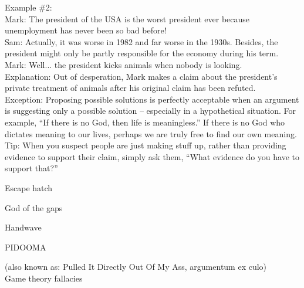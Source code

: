 \documentclass[a4paper,12pt,single,pdftex]{scrartcl}
\begin{document}
{    
      Example \#2:
    \\

    
      Mark: The president of the USA is the worst president ever because unemployment has never been so bad before!
    \\

    
      Sam: Actually, it was worse in 1982 and far worse in the 1930s.  Besides, the president might only be partly responsible for the economy during his term.
    \\

    
      Mark: Well... the president kicks animals when nobody is looking.
    \\

    
      Explanation: Out of desperation, Mark makes a claim about the president's private treatment of animals after his original claim has been refuted.
    \\

    
      Exception: Proposing possible solutions is perfectly acceptable when an argument is suggesting only a possible solution -- especially in a hypothetical situation. For example, “If there is no God, then life is meaningless.”  If there is no God who dictates meaning to our lives, perhaps we are truly free to find our own meaning.
    \\

    
      Tip: When you suspect people are just making stuff up, rather than providing evidence to support their claim, simply ask them, “What evidence do you have to support that?”
    \\

  }


Escape hatch

God of the gaps

Handwave

PIDOOMA
    
      (also known as:  Pulled It Directly Out Of My Ass, argumentum ex culo)
    \\

  

Game theory fallacies
\end{document}
